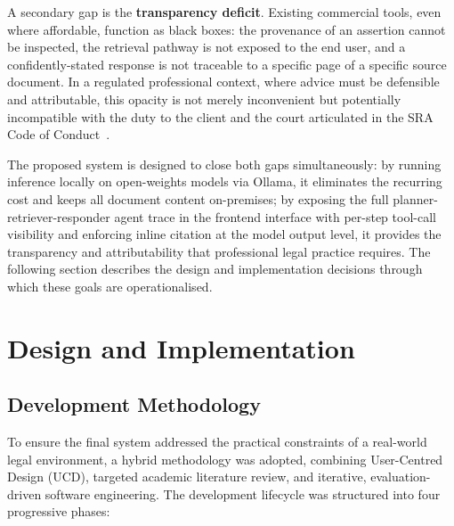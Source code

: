 \documentclass[11pt,a4paper]{article}
\begin{document}
A secondary gap is the \textbf{transparency deficit}. Existing commercial tools, even where
affordable, function as black boxes: the provenance of an assertion cannot be inspected, the
retrieval pathway is not exposed to the end user, and a confidently-stated response is not
traceable to a specific page of a specific source document. In a regulated professional
context, where advice must be defensible and attributable, this opacity is not merely
inconvenient but potentially incompatible with the duty to the client and the court
articulated in the SRA Code of Conduct~\cite{sra2023}.

The proposed system is designed to close both gaps simultaneously: by running inference
locally on open-weights models via Ollama, it eliminates the recurring cost and keeps all
document content on-premises; by exposing the full planner-retriever-responder agent trace in
the frontend interface with per-step tool-call visibility and enforcing inline citation at the
model output level, it provides the transparency and attributability that professional legal
practice requires.  The following section describes the design and implementation decisions
through which these goals are operationalised.

\section{Design and Implementation}
\label{sec:implementation}

\subsection{Development Methodology}

To ensure the final system addressed the practical constraints of a real-world legal environment, a hybrid methodology was adopted, combining User-Centred Design (UCD), targeted academic literature review, and iterative, evaluation-driven software engineering. The development lifecycle was structured into four progressive phases:
\end{document}
